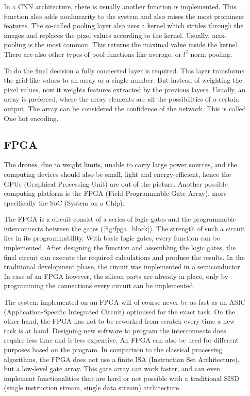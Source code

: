 In a CNN architecture, there is usually another function is implemented.
This function also adds nonlinearity to the system and also raises the most prominent features.
The so-called pooling layer also uses a kernel which strides through the images and replaces the pixel values according to the kernel.
Usually, max-pooling is the most common.
This returns the maximal value inside the kernel.
There are also other types of pool functions like average, or $l^2$ norm pooling.

To do the final decision a fully connected layer is required.
This layer transforms the grid-like values to an array or a single number.
But instead of weighting the pixel values, now it weights features extracted by the previous layers.
Usually, an array is preferred, where the array elements are all the possibilities of a certain output.
The array can be considered the confidence of the network.
This is called One hot encoding.

\subsection{FPGA} %
The drones, due to weight limits, unable to carry large power sources, and the computing devices should also be small, light and energy-efficient, hence the GPUs (Graphical Processing Unit) are out of the picture.
Another possible computing platform is the FPGA (Field Programmable Gate Array), more specifically the SoC (System on a Chip).

The FPGA is a circuit consist of a series of logic gates and the programmable interconnects between the gates (\cref{fig:fpga_block}).
The strength of such a circuit lies in its programmability.
With basic logic gates, every function can be implemented.
After designing the function and assembling the logic gates, the final circuit can execute the required calculations and produce the results.
In the traditional development phase, the circuit was implemented in a semiconductor.
In case of an FPGA however, the silicon parts are already in place, only by programming the connections every circuit can be implemented.

The system implemented on an FPGA will of course never be as fast as an ASIC (Application-Specific Integrated Circuit) optimised for the exact task.
On the other hand, the FPGA has not to be reworked from scratch every time a new task is at hand.
Designing new software to program the interconnects does require less time and is less expensive.
An FPGA can also be used for different purposes based on the program.
In comparison to the classical processing algorithms, the FPGA does not use a finite ISA (Instruction Set Architecture), but a low-level gate array.
This gate array can work faster, and can even implement functionalities that are hard or not possible with a traditional SISD (single instruction stream, single data stream) architecture.

